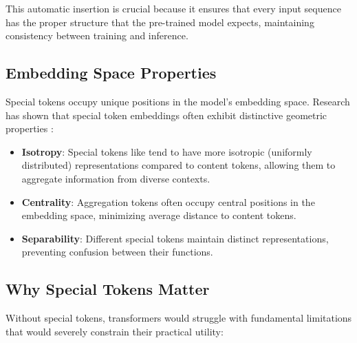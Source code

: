 This automatic insertion is crucial because it ensures that every input sequence has the proper structure that the pre-trained model expects, maintaining consistency between training and inference.

\subsection{Embedding Space Properties}

Special tokens occupy unique positions in the model's embedding space. Research has shown that special token embeddings often exhibit distinctive geometric properties \citep{clark2019what, rogers2020primer}:

\begin{itemize}
\item \textbf{Isotropy}: Special tokens like \cls{} tend to have more isotropic (uniformly distributed) representations compared to content tokens, allowing them to aggregate information from diverse contexts.

\item \textbf{Centrality}: Aggregation tokens often occupy central positions in the embedding space, minimizing average distance to content tokens.

\item \textbf{Separability}: Different special tokens maintain distinct representations, preventing confusion between their functions.
\end{itemize}

\subsection{Why Special Tokens Matter}

Without special tokens, transformers would struggle with fundamental limitations that would severely constrain their practical utility:

